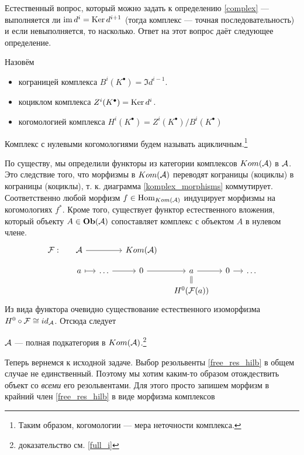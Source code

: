 \documentclass[../main.tex]{subfiles}
\begin{document}
Естественный вопрос, который можно задать к определению \ref{complex} --- выполняется ли $\mathop{\mathrm{im}}\nolimits d^i = \mathop{\mathrm{Ker}}\nolimits d^{i+1}$ (тогда комплекс --- точная последовательность) и если невыполняется, то насколько. Ответ на этот вопрос даёт следующее определение.
\begin{to_def}
Назовём 
\begin{itemize}
\item кограницей комплекса $B^i(K^\bullet) = \Im d^{i-1}$.
\item коциклом комплекса $Z^i(K^\bullet) = \mathop{\mathrm{Ker}}\nolimits d^{i}$.
\item когомологией комплекса $H^i(K^\bullet) = Z^i(K^\bullet)/B^i(K^\bullet)$
\end{itemize}
Комплекс с нулевыми когомологиями будем называть ацикличным.\footnote{Таким образом, когомологии --- мера неточности комплекса. }
\end{to_def}
По существу, мы определили функторы из категории комплексов $Kom(\mathcal{A})$ в $\mathcal{A}$. Это следствие того, что морфизмы в $Kom(\mathcal{A})$ переводят кограницы (коциклы) в кограницы (коциклы), т. к. диаграмма \eqref{komplex_morphisms} коммутирует. Соответственно любой морфизм $f\in \operatorname{Hom}_{Kom(\mathcal{A})}$ индуцирует морфизмы на когомологиях $f^*$.
Кроме того, существует функтор естественного вложения, который объекту $A \in \mathbf{Ob}(\mathcal{A})$ сопоставляет комплекс с объектом $A$ в нулевом члене.
\begin{equation*}
    \begin{tikzcd}[sep=small]
	{\F:} & \A & {} & {Kom(\A)} \\
	{} & a & \ldots & 0 & a & 0 & \ldots \\
	&&&& {H^0(\F(a))}
	\arrow[from=2-3, to=2-4]
	\arrow[from=2-4, to=2-5]
	\arrow[from=2-5, to=2-6]
	\arrow[from=2-6, to=2-7]
	\arrow[Rightarrow, no head, from=2-5, to=3-5]
	\arrow[maps to, from=2-2, to=2-3]
	\arrow[from=1-2, to=1-4]
\end{tikzcd}
\end{equation*}
Из вида функтора очевидно существование естественного изоморфизма $H^0\circ \mathcal{F} \cong id_{\mathcal{A}}$. Отсюда следует
\begin{to_suj}
$\mathcal{A}$ --- полная подкатегория в $Kom(\mathcal{A})$.\footnote{доказательство см. \ref{full_i}}
\end{to_suj}
Теперь вернемся к исходной задаче. Выбор резольвенты \eqref{free_res_hilb} в общем случае не единственный. Поэтому мы хотим каким-то образом отождествить объект со \emph{всеми} его резольвентами. Для этого просто запишем морфизм в крайний член \ref{free_res_hilb} в виде морфизма комплексов
\end{document}
